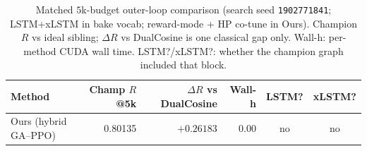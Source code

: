 \begin{table}[t]
  \centering
  \caption{Matched $5$k-budget outer-loop comparison (search seed \texttt{1902771841}; LSTM+xLSTM in bake vocab; reward-mode + HP co-tune in Ours). Champion $R$ vs ideal sibling; $\Delta R$ vs DualCosine is one classical gap only. Wall-h: per-method CUDA wall time. LSTM?/xLSTM?: whether the champion graph included that block.}
  \label{tab:meta-approaches}
  \setlength{\tabcolsep}{3pt}
  \small
  \begin{tabular}{@{}lrrrcc@{}}
    \toprule
    Method & Champ $R$@5k & $\Delta R$ vs DualCosine & Wall-h & LSTM? & xLSTM? \\
    \midrule
    Ours (hybrid GA--PPO) & 0.80135 & $+0.26183$ & 0.00 & no & no \\
    \bottomrule
  \end{tabular}
\end{table}
